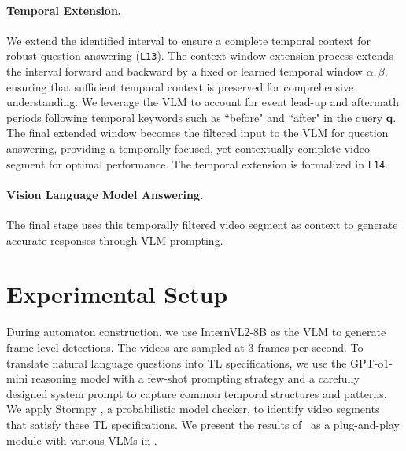 \documentclass[letterpaper]{article} %
\begin{document}
    \paragraph{Temporal Extension.}
    We extend the identified interval to ensure a complete temporal context for robust question answering (\texttt{L13}). The context window extension process extends the interval forward and backward by a fixed or learned temporal window $\alpha, \beta$, ensuring that sufficient temporal context is preserved for comprehensive understanding. We leverage the VLM to account for event lead-up and aftermath periods following temporal keywords such as ``before" and ``after" in the query $\textbf{q}$. The final extended window becomes the filtered input to the VLM for question answering, providing a temporally focused, yet contextually complete video segment for optimal performance. The temporal extension is formalized in \texttt{L14}.

    \paragraph{Vision Language Model Answering.}
        \label{subsec:vlm_answering}
        The final stage uses this temporally filtered video segment as context to generate accurate responses through VLM prompting.

\section{Experimental Setup}
    During automaton construction, we use InternVL2-8B \citep{internvl2024v2} as the VLM to generate frame-level detections. The videos are sampled at 3 frames per second. To translate natural language questions into TL specifications, we use the GPT-o1-mini reasoning model \citep{achiam2023gpt} with a few-shot prompting strategy and a carefully designed system prompt to capture common temporal structures and patterns. We apply Stormpy \citep{storm, stormpy}, a probabilistic model checker, to identify video segments that satisfy these TL specifications. We present the results of \nsvqa\ as a plug-and-play module with various VLMs in . 
\end{document}
